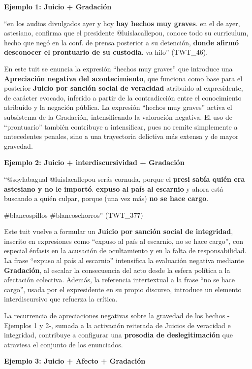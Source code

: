 \documentclass[spanish]{textolivre}
\begin{document}
\textbf{Ejemplo 1: Juicio + Gradación}

“en los audios divulgados ayer y hoy \textbf{hay hechos muy graves}. en el de ayer, astesiano, confirma que el presidente @luislacallepou, conoce todo su curriculum, hecho que negó en la conf. de prensa posterior a su detención, \textbf{donde afirmó desconocer el prontuario de su custodia}. va hilo” (TWT\_46).

En este tuit se enuncia la expresión “hechos muy graves” que introduce una \textbf{Apreciación negativa del acontecimiento}, que funciona como base para el posterior \textbf{Juicio por sanción social de veracidad} atribuido al expresidente, de carácter evocado, inferido a partir de la contradicción entre el conocimiento atribuido y la negación pública. La expresión “hechos muy graves” activa el subsistema de la Gradación, intensificando la valoración negativa. El uso de “prontuario” también contribuye a intensificar, pues no remite simplemente a antecedentes penales, sino a una trayectoria delictiva más extensa y de mayor gravedad.

\textbf{Ejemplo 2: Juicio + interdiscursividad + Gradación}

“@soylabagual @luislacallepou serás cornuda, porque el \textbf{presi sabía quién era astesiano y no le importó}. \textbf{expuso al país al escarnio} y ahora está buscando a quién culpar, porque (una vez más) \textbf{no se hace cargo}.

\#blancospillos \#blancoschorros” (TWT\_377)

Este tuit vuelve a formular un \textbf{Juicio por sanción social de integridad}, inscrito en expresiones como “expuso al país al escarnio, no se hace cargo”, con especial énfasis en la acusación de ocultamiento y en la falta de responsabilidad. La frase “expuso al país al escarnio” intensifica la evaluación negativa mediante \textbf{Gradación}, al escalar la consecuencia del acto desde la esfera política a la afectación colectiva. Además, la referencia intertextual a la frase “no se hace cargo”, usada por el expresidente en su propio discurso, introduce un elemento interdiscursivo que refuerza la crítica.

La recurrencia de apreciaciones negativas sobre la gravedad de los hechos - Ejemplos 1 y 2-, sumada a la activación reiterada de Juicios de veracidad e integridad, contribuye a configurar una \textbf{prosodia de deslegitimación} que atraviesa el conjunto de los enunciados.

\textbf{Ejemplo 3: Juicio + Afecto + Gradación}
\end{document}
